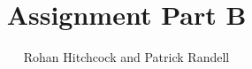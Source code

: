 \documentclass[11pt]{article}
\begin{document}
    \title{\textbf{Assignment Part B}}
    \author{Rohan Hitchcock and Patrick Randell}
    \date{}
    \maketitle

    \Blindtext
\end{document}
